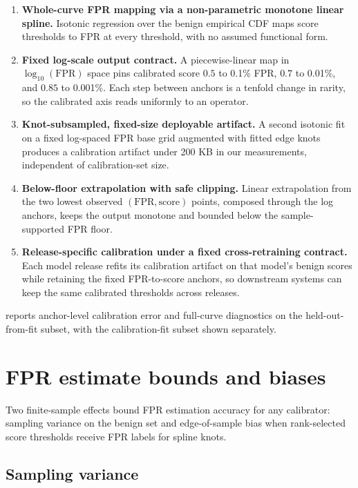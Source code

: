\documentclass{article}
\begin{document}
\begin{enumerate}
  \item \textbf{Whole-curve FPR mapping via a non-parametric monotone linear spline.}
    Isotonic regression over the benign empirical CDF maps score thresholds to FPR at every threshold, with no assumed functional form.
  \item \textbf{Fixed log-scale output contract.}
    A piecewise-linear map in $\log_{10}(\mathrm{FPR})$ space pins calibrated score $0.5$ to 0.1\% FPR, $0.7$ to 0.01\%, and $0.85$ to 0.001\%.
    Each step between anchors is a tenfold change in rarity, so the calibrated axis reads uniformly to an operator.
  \item \textbf{Knot-subsampled, fixed-size deployable artifact.}
    A second isotonic fit on a fixed log-spaced FPR base grid augmented with fitted edge knots produces a calibration artifact under 200 KB in our measurements, independent of calibration-set size.
  \item \textbf{Below-floor extrapolation with safe clipping.}
    Linear extrapolation from the two lowest observed $(\mathrm{FPR}, \mathrm{score})$ points, composed through the log anchors, keeps the output monotone and bounded below the sample-supported FPR floor.
  \item \textbf{Release-specific calibration under a fixed cross-retraining contract.}
    Each model release refits its calibration artifact on that model's benign scores while retaining the fixed FPR-to-score anchors, so downstream systems can keep the same calibrated thresholds across releases.
\end{enumerate}

 reports anchor-level calibration error and full-curve diagnostics on the held-out-from-fit subset, with the calibration-fit subset shown separately.

\section{FPR estimate bounds and biases}
\label{sec:reliability}

Two finite-sample effects bound FPR estimation accuracy for any calibrator: sampling variance on the benign set and edge-of-sample bias when rank-selected score thresholds receive FPR labels for spline knots.

\subsection{Sampling variance}
\label{sec:precision}
\end{document}
